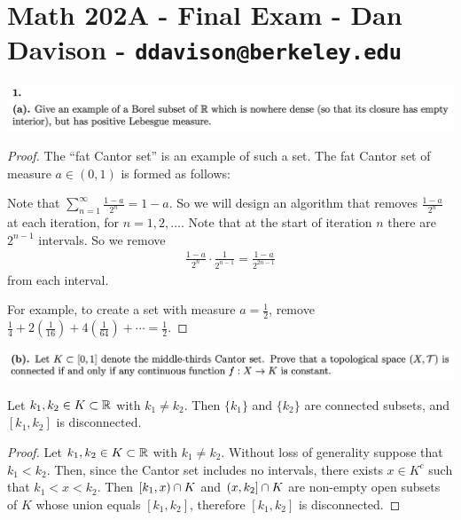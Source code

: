 \section*{Math 202A - Final Exam - Dan Davison - \texttt{ddavison@berkeley.edu}}

\begin{mdframed}
  \includegraphics[width=400pt]{img/analysis--berkeley-202a-final-c9d2.png}
\end{mdframed}



\begin{proof}
  The ``fat Cantor set​'' is an example of such a set. The fat Cantor set of measure $a \in (0, 1)$ is formed as
  follows:

  Note that $\sum_{n=1}^\infty \frac{1 - a}{2^n} = 1 - a$. So we will design an algorithm that
  removes $\frac{1-a}{2^n}$ at each iteration, for $n=1, 2, \ldots$. Note that at the start of iteration $n$
  there are $2^{n-1}$ intervals. So we remove
  \begin{align*}
    \frac{1-a}{2^{n}}\cdot\frac{1}{2^{n-1}} = \frac{1 - a}{2^{2n - 1}}
  \end{align*}
  from each interval.

  For example, to create a set with measure $a = \frac{1}{2}$,
  remove $\frac{1}{4} + 2(\frac{1}{16}) + 4(\frac{1}{64}) + \cdots = \frac{1}{2}$.
\end{proof}

\begin{mdframed}
  \includegraphics[width=400pt]{img/analysis--berkeley-202a-final-4333.png}
\end{mdframed}

\begin{lemma}\label{cantor-set-totally-disconnected}
  Let $k_1, k_2 \in K \subset \mathbb{R}$ with $k_1 \neq k_2$. Then $\{k_1\}$ and $\{k_2\}$ are connected subsets,
  and $[k_1, k_2]$ is disconnected.
\end{lemma}

\begin{proof}
  Let $k_1, k_2 \in K \subset \mathbb{R}$ with $k_1 \neq k_2$. Without loss of generality suppose
  that $k_1 < k_2$. Then, since the Cantor set includes no intervals, there exists $x \in K^c$ such
  that $k_1 < x < k_2$. Then $[k_1, x) \cap K$ and $(x, k_2] \cap K$ are non-empty open subsets
  of $K$ whose union equals $[k_1, k_2]$, therefore $[k_1, k_2]$ is disconnected.
\end{proof}

